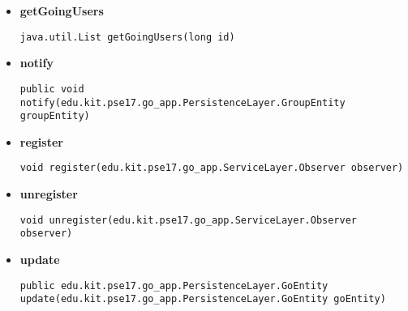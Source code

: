 \documentclass[11pt,a4paper]{report}
\begin{document}
{{{{{{{{{{{{{{\begin{itemize}
{\begin{lstlisting}[frame=none]
java.util.List getDeclinedusers(long id)\end{lstlisting} %
}%
\item{ 
\hypertarget{edu.kit.pse17.go_app.PersistenceLayer.daos.GroupDaoImp.getGoingUsers(long)}{{\bf  getGoingUsers}\\}
\begin{lstlisting}[frame=none]
java.util.List getGoingUsers(long id)\end{lstlisting} %
}%
\item{ 
\hypertarget{edu.kit.pse17.go_app.PersistenceLayer.daos.GroupDaoImp.notify(edu.kit.pse17.go_app.PersistenceLayer.GroupEntity)}{{\bf  notify}\\}
\begin{lstlisting}[frame=none]
public void notify(edu.kit.pse17.go_app.PersistenceLayer.GroupEntity groupEntity)\end{lstlisting} %
}%
\item{ 
\hypertarget{edu.kit.pse17.go_app.PersistenceLayer.daos.GroupDaoImp.register(edu.kit.pse17.go_app.ServiceLayer.Observer)}{{\bf  register}\\}
\begin{lstlisting}[frame=none]
void register(edu.kit.pse17.go_app.ServiceLayer.Observer observer)\end{lstlisting} %
}%
\item{ 
\hypertarget{edu.kit.pse17.go_app.PersistenceLayer.daos.GroupDaoImp.unregister(edu.kit.pse17.go_app.ServiceLayer.Observer)}{{\bf  unregister}\\}
\begin{lstlisting}[frame=none]
void unregister(edu.kit.pse17.go_app.ServiceLayer.Observer observer)\end{lstlisting} %
}%
\item{ 
\hypertarget{edu.kit.pse17.go_app.PersistenceLayer.daos.GroupDaoImp.update(edu.kit.pse17.go_app.PersistenceLayer.GoEntity)}{{\bf  update}\\}
\begin{lstlisting}[frame=none]
public edu.kit.pse17.go_app.PersistenceLayer.GoEntity update(edu.kit.pse17.go_app.PersistenceLayer.GoEntity goEntity)\end{lstlisting} %
}%
\end{itemize}
}
}}}}}}}}}}}}}
\end{document}
